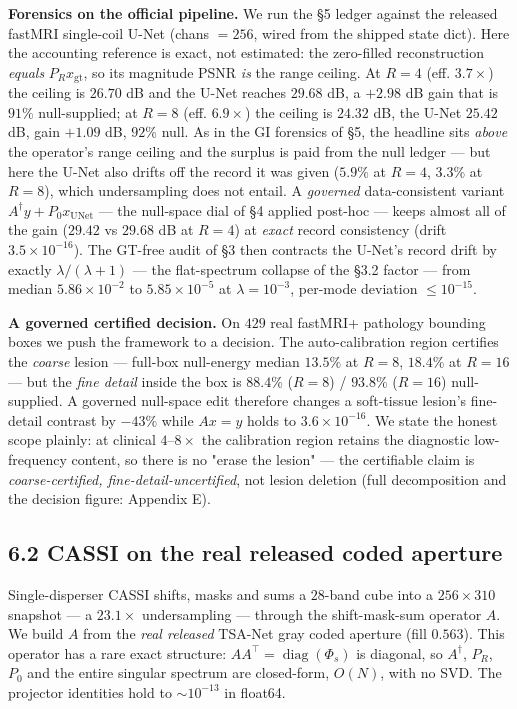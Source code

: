 \documentclass[11pt]{article}
\begin{document}
\textbf{Forensics on the official pipeline.} We run the §5 ledger against the released fastMRI single-coil U-Net (chans $=256$, wired from the shipped state dict). Here the accounting reference is exact, not estimated: the zero-filled reconstruction \textit{equals} $P_R x_\text{gt}$, so its magnitude PSNR \textit{is} the range ceiling. At $R{=}4$ (eff. $3.7\times$) the ceiling is $26.70$ dB and the U-Net reaches $29.68$ dB, a $+2.98$ dB gain that is $91\%$ null-supplied; at $R{=}8$ (eff. $6.9\times$) the ceiling is $24.32$ dB, the U-Net $25.42$ dB, gain $+1.09$ dB, $92\%$ null. As in the GI forensics of §5, the headline sits \textit{above} the operator's range ceiling and the surplus is paid from the null ledger --- but here the U-Net also drifts off the record it was given ($5.9\%$ at $R{=}4$, $3.3\%$ at $R{=}8$), which undersampling does not entail. A \textit{governed} data-consistent variant $A^\dagger y + P_0 x_\text{UNet}$ --- the null-space dial of §4 applied post-hoc --- keeps almost all of the gain ($29.42$ vs $29.68$ dB at $R{=}4$) at \textit{exact} record consistency (drift $3.5\times10^{-16}$). The GT-free audit of §3 then contracts the U-Net's record drift by exactly $\lambda/(\lambda+1)$ --- the flat-spectrum collapse of the §3.2 factor --- from median $5.86\times10^{-2}$ to $5.85\times10^{-5}$ at $\lambda=10^{-3}$, per-mode deviation $\le10^{-15}$.

\textbf{A governed certified decision.} On $429$ real fastMRI+ pathology bounding boxes we push the framework to a decision. The auto-calibration region certifies the \textit{coarse} lesion --- full-box null-energy median $13.5\%$ at $R{=}8$, $18.4\%$ at $R{=}16$ --- but the \textit{fine detail} inside the box is $88.4\%$ ($R{=}8$) / $93.8\%$ ($R{=}16$) null-supplied. A governed null-space edit therefore changes a soft-tissue lesion's fine-detail contrast by $-43\%$ while $Ax=y$ holds to $3.6\times10^{-16}$. We state the honest scope plainly: at clinical $4$--$8\times$ the calibration region retains the diagnostic low-frequency content, so there is no "erase the lesion" --- the certifiable claim is \textit{coarse-certified, fine-detail-uncertified}, not lesion deletion (full decomposition and the decision figure: Appendix E).

\subsection*{6.2 CASSI on the real released coded aperture}

Single-disperser CASSI shifts, masks and sums a $28$-band cube into a $256\times310$ snapshot --- a $23.1\times$ undersampling --- through the shift-mask-sum operator $A$. We build $A$ from the \textit{real released} TSA-Net gray coded aperture (fill $0.563$). This operator has a rare exact structure: $AA^\top = \operatorname{diag}(\Phi_s)$ is diagonal, so $A^\dagger$, $P_R$, $P_0$ and the entire singular spectrum are closed-form, $O(N)$, with no SVD. The projector identities hold to ${\sim}10^{-13}$ in float64.
\end{document}
